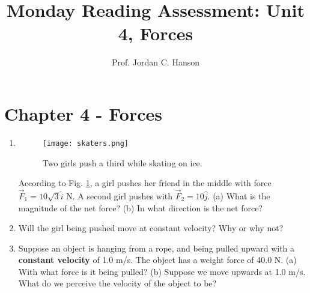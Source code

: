 \documentclass{article}
\begin{document}
\title{Monday Reading Assessment: Unit 4, Forces}
\author{Prof. Jordan C. Hanson}

\maketitle

\section{Chapter 4 - Forces}

\begin{enumerate}
\item 
\begin{figure}[ht]
\centering
\texttt{[image: skaters.png]}
\caption{\label{fig:skate} Two girls push a third while skating on ice.}
\end{figure}
According to Fig. \ref{fig:skate}, a girl pushes her friend in the middle with force $\vec{F}_1 = 10\sqrt{3}\hat{i}$ N.  A second girl pushes with $\vec{F}_2 = 10\hat{j}$. (a) What is the magnitude of the net force?  (b) In what direction is the net force? \\ \vspace{3cm}
\item Will the girl being pushed move at constant velocity?  Why or why not? \\ \vspace{2cm}
\item Suppose an object is hanging from a rope, and being pulled upward with a \textbf{constant velocity} of 1.0 m/s.  The object has a weight force of 40.0 N.  (a) With what force is it being pulled?  (b) Suppose we move upwards at 1.0 m/s.  What do we perceive the velocity of the object to be?
\end{enumerate}
\end{document}
